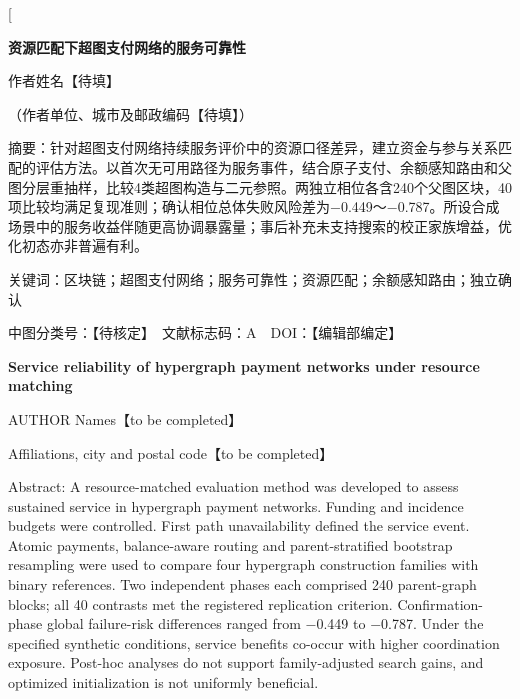 \documentclass[UTF8,a4paper,twocolumn,fontset=none,zihao=5]{ctexart}
\begin{document}
\twocolumn[{\begin{minipage}{\textwidth}

\begin{center}\bfseries 资源匹配下超图支付网络的服务可靠性\end{center}

\begin{center}\small 作者姓名【待填】\end{center}

\begin{center}\small （作者单位、城市及邮政编码【待填】）\end{center}

{\small\noindent 摘要：针对超图支付网络持续服务评价中的资源口径差异，建立资金与参与关系匹配的评估方法。以首次无可用路径为服务事件，结合原子支付、余额感知路由和父图分层重抽样，比较4类超图构造与二元参照。两独立相位各含240个父图区块，40项比较均满足复现准则；确认相位总体失败风险差为$-$0.449～$-$0.787。所设合成场景中的服务收益伴随更高协调暴露量；事后补充未支持搜索的校正家族增益，优化初态亦非普遍有利。\par}\vspace{3pt}

{\small\noindent 关键词：区块链；超图支付网络；服务可靠性；资源匹配；余额感知路由；独立确认\par}\vspace{3pt}

{\small\noindent 中图分类号：【待核定】　文献标志码：A　DOI：【编辑部编定】\par}\vspace{3pt}

\begin{center}\large\bfseries Service reliability of hypergraph payment networks under resource matching\end{center}

\begin{center}\small AUTHOR Names【to be completed】\end{center}

\begin{center}\small Affiliations, city and postal code【to be completed】\end{center}

{\small\noindent Abstract: A resource-matched evaluation method was developed to assess sustained service in hypergraph payment networks. Funding and incidence budgets were controlled. First path unavailability defined the service event. Atomic payments, balance-aware routing and parent-stratified bootstrap resampling were used to compare four hypergraph construction families with binary references. Two independent phases each comprised 240 parent-graph blocks; all 40 contrasts met the registered replication criterion. Confirmation-phase global failure-risk differences ranged from $-$0.449 to $-$0.787. Under the specified synthetic conditions, service benefits co-occur with higher coordination exposure. Post-hoc analyses do not support family-adjusted search gains, and optimized initialization is not uniformly beneficial.\par}\vspace{3pt}


\end{minipage}}
\end{document}
